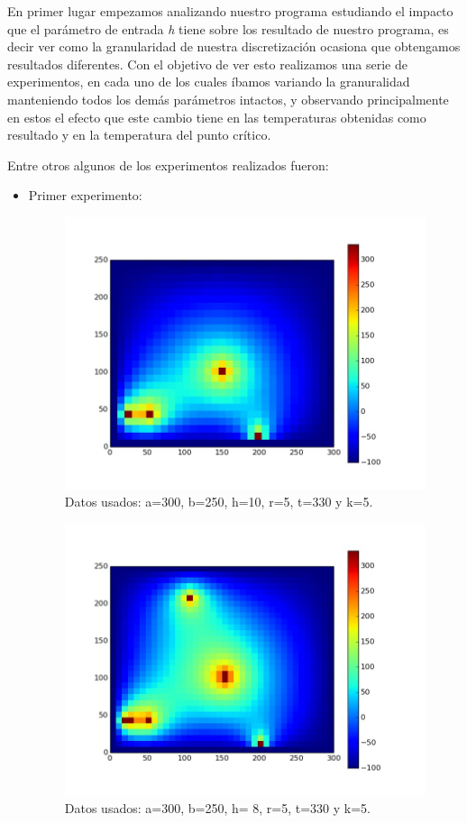 \documentclass[10pt, a4paper]{article}
\begin{document}
En primer lugar empezamos analizando nuestro programa estudiando el impacto que el par\'ametro de entrada \textit{h} tiene sobre los resultado de nuestro programa, es decir ver como la granularidad de nuestra discretizaci\'on ocasiona que obtengamos resultados diferentes. Con el objetivo de ver esto realizamos una serie de experimentos, en cada uno de los cuales \'ibamos variando la granuralidad manteniendo todos los dem\'as par\'ametros intactos, y observando principalmente en estos el efecto que este cambio tiene en las temperaturas obtenidas como resultado y en la temperatura del punto cr\'itico.

Entre otros algunos de los experimentos realizados fueron:
\begin{itemize}

\item Primer experimento:

\begin{figure}[H]
\centering
  \includegraphics[scale=0.4]{E1ConH10.jpg}
	\caption{Datos usados: a=300, b=250, h=10, r=5, t=330 y k=5.}
\end{figure}


\begin{figure}[H]
\centering
  \includegraphics[scale=0.4]{E1ConH8.jpg}
	\caption{Datos usados: a=300, b=250, h= 8, r=5, t=330 y k=5.}
\end{figure}



\end{itemize}
\end{document}
